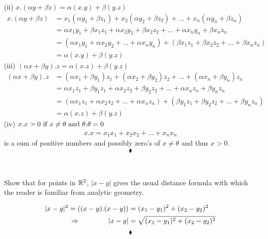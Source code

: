 (ii) $x . (\alpha y + \beta z) = \alpha(x.y) + \beta(y.z)$\\
\begin{align*}
x . (\alpha y + \beta z) &= x_1 (\alpha y_1+\beta z_1)+x_2 (\alpha y_2+\beta z_2)+\dots +x_n (\alpha y_n+\beta z_n)\\
&= \alpha x_1 y_1+\beta x_1 z_1+\alpha x_2 y_2+\beta x_2 z_2+\dots +\alpha x_n y_n+\beta x_n z_n\\
&= (\alpha x_1 y_1+\alpha x_2 y_2+\dots +\alpha x_n y_n) +(\beta x_1 z_1+ \beta x_2 z_2+\dots +\beta x_n z_n)\\
&= \alpha(x.y) + \beta(y.z)
\end{align*}
(iii) $(\alpha x + \beta y). z = \alpha(x . z) + \beta(y.z)$\\
\begin{align*}
(\alpha x + \beta y). z &= (\alpha x_1+\beta y_1)z_1+ (\alpha x_2+\beta y_2)z_2+\dots + (\alpha x_n+\beta y_n)z_n\\
&= \alpha x_1z_1+\beta y_1z_1+ \alpha x_2 z_2+\beta y_2z_2+\dots + \alpha x_nz_n +\beta y_nz_n\\
&= (\alpha x_1z_1+ \alpha x_2 z_2+\dots + \alpha x_nz_n )+(\beta y_1z_1+ \beta y_2z_2+\dots +\beta y_nz_n)\\
&=\alpha(x . z) + \beta(y.z)
\end{align*}
(iv) $x .x > 0 \text{ if } x\neq \theta \text{ and } \theta.\theta = 0$\\
\begin{align*}
x .x = x_1 x_1+ x_2 x_2+\dots + x_nx_n 
\end{align*}
is  a sum of positive numbers and possibly zero's of $x\neq \theta$ and thus $x>0$.
$$\blacklozenge$$\\


\subsection{}
\begin{tcolorbox}
Show that for points in $\mathbb{R}^2$, $|x-y|$ gives the usual distance formula with which the reader is familiar from analytic geometry.
\end{tcolorbox}
\begin{align*}
|x-y|^2= \left((x-y).(x-y)\right)&=(x_1-y_1)^2+(x_2-y_2)^2\\
\Rightarrow \quad\quad\quad\quad |x-y|&= \sqrt{(x_1-y_1)^2+(x_2-y_2)^2}
\end{align*}
$$\blacklozenge$$\\
